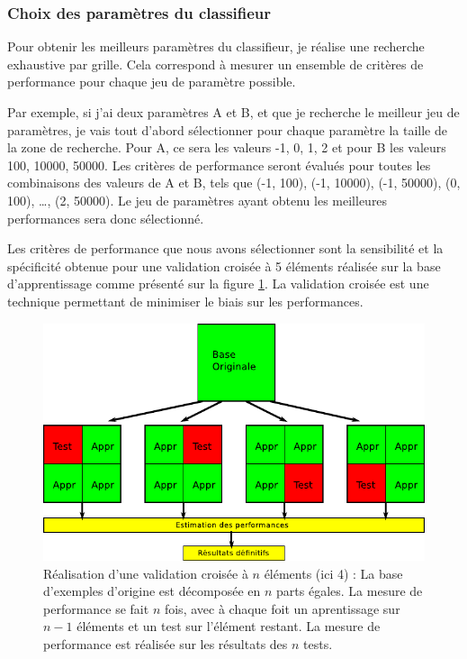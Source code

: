 \subsubsection{Choix des paramètres du classifieur}

Pour obtenir les meilleurs paramètres du classifieur, je réalise une recherche exhaustive par grille. Cela correspond à mesurer un ensemble de critères de performance pour chaque jeu de paramètre possible.

Par exemple, si j'ai deux paramètres A et B, et que je recherche le meilleur jeu de paramètres, je vais tout d'abord sélectionner pour chaque paramètre la taille de la zone de recherche. Pour A, ce sera les valeurs {-1, 0, 1, 2} et pour B les valeurs {100, 10000, 50000}. Les critères de performance seront évalués pour toutes les combinaisons des valeurs de A et B, tels que (-1, 100), (-1, 10000), (-1, 50000), (0, 100), \dots, (2, 50000). Le jeu de paramètres ayant obtenu les meilleures performances sera donc sélectionné. 

Les critères de performance que nous avons sélectionner sont la sensibilité et la spécificité obtenue pour une validation croisée à 5 éléments réalisée sur la base d'apprentissage comme présenté sur la figure \ref{fig:crossValid}. La validation croisée est une technique permettant de minimiser le biais sur les performances.

\begin{figure}[h!]
 \label{fig:crossValid}
 \includegraphics[width=15cm]{images/crossValid}
 \caption{Réalisation d'une validation croisée à $n$ éléments (ici 4) : La base d'exemples d'origine est décomposée en $n$ parts égales. La mesure de performance se fait $n$ fois, avec à chaque foit un aprentissage sur $n-1$ éléments et un test sur l'élément restant. La mesure de performance est réalisée sur les résultats des $n$ tests.}
\end{figure}


